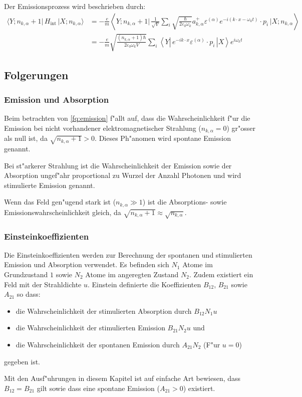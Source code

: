 Der Emissionsprozess wird beschrieben durch:
\begin{equation} \label{fq:emission}
\begin{split}
\langle Y; n_{k,\alpha} + 1 |\, H_{\text{int}} \,| X; n_{k,\alpha} \rangle &= 
-\frac{e}{m} \left\langle Y; n_{k,\alpha} + 1 \biggl| 
\, \frac{1}{\sqrt{V}} \sum_i \sqrt{\frac{\hbar}{2 \varepsilon_0 \omega_k}}a^+_{k,\alpha} \varepsilon^{(\alpha)} e^{-i(k \cdot x-\omega_k t)} \cdot p_i \,
\biggl| X; n_{k,\alpha} \right\rangle\\
&= -\frac{e}{m} \sqrt{\frac{ (n_{k,\alpha}+1) \hbar}{2 \varepsilon_0 \omega_k V}} \sum_i \left\langle Y \left| 
\, e^{-ik \cdot x} \varepsilon^{(\alpha)} \cdot p_i \,
\right| X \right\rangle e^{i\omega_k t}
\end{split}
\end{equation}

\subsection{Folgerungen}
\subsubsection{Emission und Absorption}
Beim betrachten von \ref{fq:emission} f"allt auf, dass die Wahrscheinlichkeit f"ur die Emission bei nicht vorhandener elektromagnetischer Strahlung ($n_{k,\alpha} = 0$) gr"osser als null ist, da $\sqrt{n_{k,\alpha}+1} > 0$. Dieses Ph"anomen wird spontane Emission genannt.

Bei st"arkerer Strahlung ist die Wahrscheinlichkeit der Emission sowie der Absorption ungef"ahr proportional zu Wurzel der Anzahl Photonen und wird stimulierte Emission genannt.

Wenn das Feld gen"ugend stark ist ($n_{k,\alpha} \gg 1$) ist die Absorptions- sowie Emissionswahrscheinlichkeit gleich, da $\sqrt{n_{k,\alpha}+1} \approx \sqrt{n_{k,\alpha}}$. 

\subsubsection{Einsteinkoeffizienten}
Die Einsteinkoeffizienten \cite{fq:einstein_koeff} werden zur Berechnung der spontanen und stimulierten Emission und Absorption verwendet. Es befinden sich $N_1$ Atome im Grundzustand $1$ sowie $N_2$ Atome im angeregten Zustand $N_2$. Zudem existiert ein Feld mit der Strahldichte $u$. Einstein definierte die Koeffizienten $B_{12}$, $B_{21}$ sowie $A_{21}$ so dass:
\begin{itemize}
	\item die Wahrscheinlichkeit der stimulierten Absorption durch $B_{12} N_1 u$
	\item die Wahrscheinlichkeit der stimulierten Emission $B_{21} N_2 u$ und
	\item die Wahrscheinlichkeit der spontanen Emission durch $A_{21} N_2$ (F"ur $u=0$)
\end{itemize}
gegeben ist.

Mit den Ausf"uhrungen in diesem Kapitel ist auf einfache Art bewiesen, dass $B_{12} = B_{21}$ gilt sowie dass eine spontane Emission ($A_{21} > 0$) existiert.